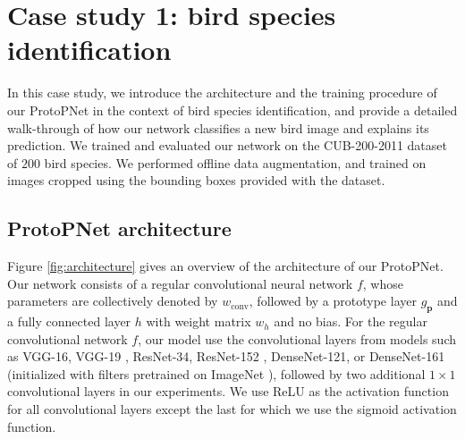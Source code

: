\documentclass{article}
\theoremstyle{definition}
\theoremstyle{remark}
\begin{document}
\afterpage{\clearpage}

\section{Case study 1: bird species identification}
%
In this case study, we introduce the architecture and the training procedure of our ProtoPNet in the context of bird species identification, and provide a detailed walk-through of how our network classifies a new bird image and explains its prediction. We trained and evaluated our network on the CUB-200-2011 dataset \cite{CUB_200_2011} of $200$ bird species. %
We performed offline data augmentation, and trained on images cropped using the bounding boxes provided with the dataset. %

\subsection{ProtoPNet architecture}
%
Figure \ref{fig:architecture} gives an overview of the architecture of our ProtoPNet. Our network consists of a regular convolutional neural network $f$, whose parameters are collectively denoted by $w_{\text{conv}}$, followed by a prototype layer $g_{\mathbf{p}}$ and a fully connected layer $h$ with weight matrix $w_h$ and no bias. For the regular convolutional network $f$, our model use the convolutional layers from models such as VGG-16, VGG-19 \cite{simonyan2014very}, ResNet-34, ResNet-152 \cite{he2016deep}, DenseNet-121, or DenseNet-161 \cite{huang2017densely} (initialized with filters pretrained on ImageNet \cite{deng2009imagenet}), followed by two additional $1 \times 1$ convolutional layers in our experiments. We use ReLU as the activation function for all convolutional layers except the last for which we use the sigmoid activation function.
\end{document}
